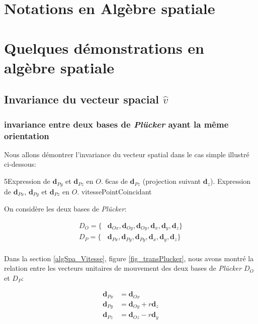 
\appendix

\chapter{Notations en Algèbre spatiale} \label{appx_notations}

\chapter{Quelques démonstrations en algèbre spatiale} \label{appx_dem}

\section{Invariance du vecteur spacial $\widehat{v}$}

\subsection{invariance entre deux bases de \emph{Plücker} ayant la même orientation}

Nous allons démontrer l'invariance du vecteur spatial dans le cas simple illustré ci-dessous:

{5}{Expression de $\textbf{d}_{Py}$ et $\textbf{d}_{Pz}$ en $O$.}
{6}{cas de $\textbf{d}_{Pz}$ (projection suivant $\textbf{d}_{z}$).}
{Expression de $\textbf{d}_{Px}$, $\textbf{d}_{Py}$ et $\textbf{d}_{Pz}$ en $O$.}
{vitessePointCoincidant}

On considère les deux bases de \emph{Plücker}:

\begin{align*}
D_{O} = \lbrace &\textbf{d}_{Ox}, \textbf{d}_{Oy}, \textbf{d}_{Oy}, \textbf{d}_{x}, \textbf{d}_{y}, \textbf{d}_{z} \rbrace \\
D_{P} = \lbrace &\textbf{d}_{Px}, \textbf{d}_{Py}, \textbf{d}_{Py}, \textbf{d}_{x}, \textbf{d}_{y}, \textbf{d}_{z} \rbrace \\
\end{align*}

Dans la section \ref{algSpa_Vitesse}, figure \ref{fig_transPlucker}, nous avons montré la relation entre les vecteurs unitaires de mouvement des deux bases de \emph{Plücker} $D_{O}$ et $D_{P}$:

\begin{align*}
  \textbf{d}_{Px} &= \textbf{d}_{Ox} \\
  \textbf{d}_{Py} &= \textbf{d}_{Oy}+r \textbf{d}_{z} \\
  \textbf{d}_{Pz} &= \textbf{d}_{Oz}-r \textbf{d}_{y}
\end{align*}

